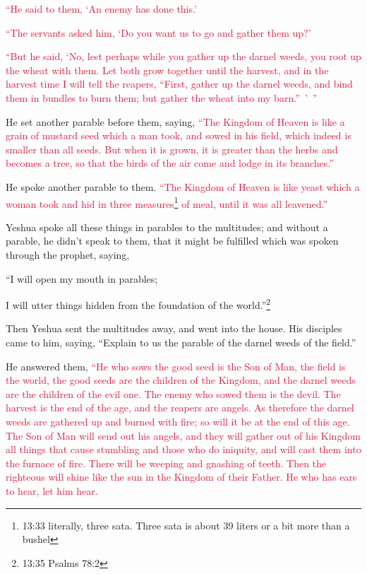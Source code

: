 \myverse{}\textcolor{crimson}{“He said to them, ‘An enemy has done this.’}

\textcolor{crimson}{“The servants asked him, ‘Do you want us to go and gather them up?’
}

\myverse{}\textcolor{crimson}{“But he said, ‘No, lest perhaps while you gather up the
	darnel weeds, you root up the wheat with them.
}
\myverse{}\textcolor{crimson}{Let both grow together until the harvest, and in the harvest time I will
	tell the reapers, “First, gather up the darnel weeds, and bind them in bundles to burn them; but gather
	the wheat into my barn.” ’ ”}

\myverse{}He set another parable before them, saying,
\textcolor{crimson}{“The Kingdom of Heaven is like a grain of mustard seed which a man took, and sowed in his field,
}
\myverse{}\textcolor{crimson}{which indeed is smaller than all seeds. But when it is grown, it is greater
	than the herbs and becomes a tree, so that the birds of the air come and lodge in its branches.”}

\myverse{}He spoke another parable to them.
\textcolor{crimson}{“The Kingdom of Heaven is like yeast which a woman took and hid in three measures}\footnote{13:33 literally, three sata. Three sata is about 39 liters or a bit more than a bushel}
\textcolor{crimson}{of meal, until it was all leavened.”}

\myverse{}Yeshua spoke all these things in parables to the multitudes;
and without a parable, he didn’t speak to them,
\myverse{}that it might be fulfilled which was spoken through the prophet, saying,

“I will open my mouth in parables;

I will utter things hidden from the foundation of the world.”\footnote{13:35 Psalms 78:2}

\myverse{}Then Yeshua sent the multitudes away, and went into the house.
His disciples came to him, saying, “Explain to us the parable of the darnel weeds of the field.”

\myverse{}He answered them,
\textcolor{crimson}{“He who sows the good seed is the Son of Man,
}
\myverse{}\textcolor{crimson}{the field is the world, the good seeds are the children of the Kingdom,
	and the darnel weeds are the children of the evil one.
}
\myverse{}\textcolor{crimson}{The enemy who sowed them is the devil. The harvest is the end of the
	age, and the reapers are angels.
}
\myverse{}\textcolor{crimson}{As therefore the darnel weeds are gathered up and burned with fire; so
	will it be at the end of this age.
}
\myverse{}\textcolor{crimson}{The Son of Man will send out his angels, and they will gather out of
	his Kingdom all things that cause stumbling and those who do iniquity,
}
\myverse{}\textcolor{crimson}{and will cast them into the furnace of fire. There will be weeping and
	gnashing of teeth.
}
\myverse{}\textcolor{crimson}{Then the righteous will shine like the sun in the Kingdom of their Father.
	He who has ears to hear, let him hear.}

